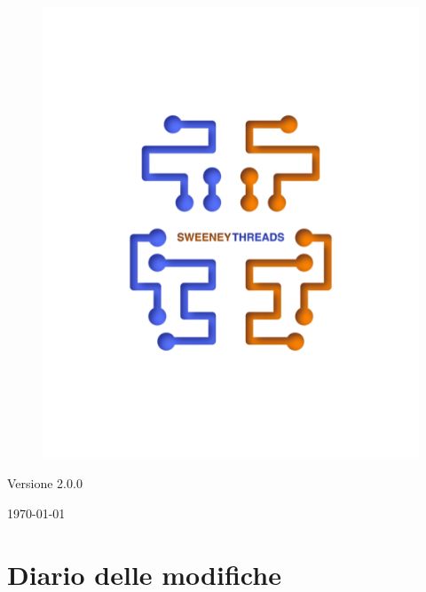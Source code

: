 \documentclass[a4paper]{article}
\begin{document}
\begin{titlepage}
		\begin{figure}[H]
		\centering
			\includegraphics[scale=0.8]{sweeney.png}
		\end{figure}
		\begin{center}
			Versione 2.0.0
		\end{center}
		{\large \today}\\[3cm] 
		\vfill  
	\end{titlepage}
	
	\tableofcontents
	
	\newpage
	\section*{Diario delle modifiche}
	
	\newpage
\end{document}
